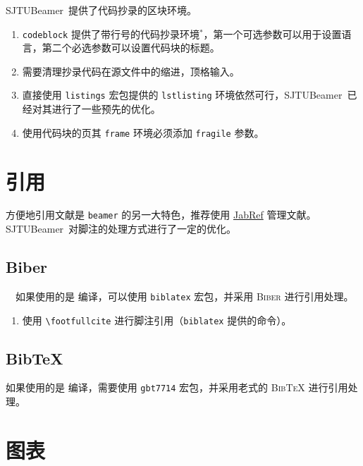 \documentclass[
    UTF8,
    heading=true,
    12pt,
    a4paper
]{ctexrep}
\def\themename{\textsf{SJTUBeamer}}
\begin{document}
    \themename\ 提供了代码抄录的区块环境。


    \begin{enumerate}\small
        \item \texttt{codeblock} 提供了带行号的代码抄录环境$^*$，第一个可选参数可以用于设置语言，第二个必选参数可以设置代码块的标题。
        \item 需要清理抄录代码在源文件中的缩进，顶格输入。
        \item 直接使用 \texttt{listings} 宏包提供的 \texttt{lstlisting} 环境依然可行，\themename\ 已经对其进行了一些预先的优化。
        \item[\faWarning] 使用代码块的页其 \texttt{frame} 环境必须添加 \texttt{fragile} 参数。
    \end{enumerate}

    
    \chapter{引用}

    方便地引用文献是 \texttt{beamer} 的另一大特色，推荐使用 \href{https://www.jabref.org/}{JabRef} 管理文献。\themename\ 对脚注的处理方式进行了一定的优化。

    \section{Biber}

    \faApple\ \faLinux\ 如果使用的是  编译，可以使用 \texttt{biblatex} 宏包，并采用 \textsc{Biber} 进行引用处理。


    \begin{enumerate}\small
        \item 使用 \texttt{\textbackslash{}footfullcite} 进行脚注引用（\texttt{biblatex} 提供的命令）。
    \end{enumerate}

    \section{Bib\TeX{}}

    \faWindows 如果使用的是  编译，需要使用 \texttt{gbt7714} 宏包，并采用老式的 \textsc{Bib\TeX{}} 进行引用处理。

    \chapter{图表}
\end{document}
